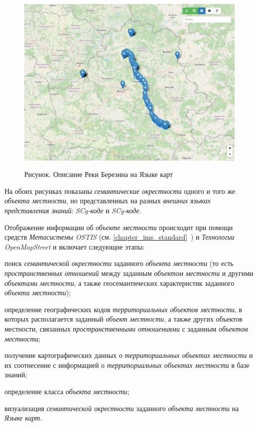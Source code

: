 \begin{figure}[H]
	\caption{Рисунок. Описание Реки Березина на Языке карт}
	\includegraphics[scale=0.45]{author/part7/figures/berezina_map.png}
	\label{fig:gis_map_berezina_map_format}
\end{figure}

На обоих рисунках показаны \textit{семантические окрестности} одного и того же \textit{объекта местности}, но представленных на разных \textit{внешних языках представления знаний}: \textit{SCg-коде} и \textit{SCg-коде}.

Отображение информации об \textit{объекте местности} происходит при помощи средств \textit{Метасистемы OSTIS} (см. \ref{chapter_ims_standard}~) и  \textit{Технологии OpenMapStreet} и включает следующие этапы:
\begin{textitemize}
	\item поиск \textit{семантической окрестности} заданного \textit{объекта местности} (то есть \textit{пространственных отношений} между заданным \textit{объектом местности} и другими \textit{объектами местности}, а также геосемантических характеристик заданного \textit{объекта местности});
	\item определение географических кодов \textit{территориальных объектов местности}, в которых располагается заданный \textit{объект местности}, а также других объектов местности, связанных \textit{пространственными отношениями} с заданным \textit{объектом местности};
	\item получение картографических данных о \textit{территориальных объектах местности} и их соотнесение с информацией о \textit{территориальных объектах местности} в базе знаний;
	\item определение класса \textit{объекта местности};
	\item визуализация \textit{семантической окрестности} заданного \textit{объекта местности} на \textit{Языке карт}.
\end{textitemize}

